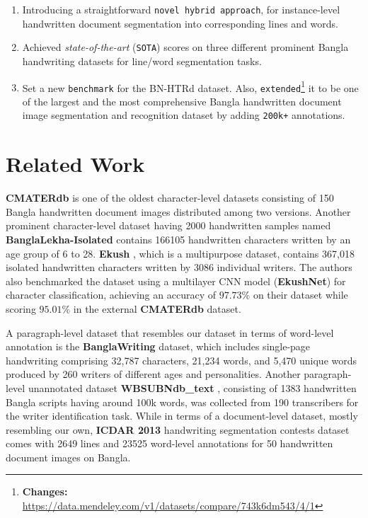 \documentclass[runningheads]{llncs}
\begin{document}
\begin{enumerate}
  \item   Introducing a straightforward \texttt{novel hybrid approach}, for instance-level handwritten document segmentation into corresponding lines and words.
  
  \item	Achieved \textit{state-of-the-art} (\texttt{SOTA}) scores on three different prominent Bangla handwriting datasets for line/word segmentation tasks.
  
  \item	Set a new \texttt{benchmark} for the BN-HTRd dataset. Also, \texttt{extended}\footnote{\textbf{Changes:} \url{https://data.mendeley.com/v1/datasets/compare/743k6dm543/4/1}} it to be one of the largest and the most comprehensive Bangla handwritten document image segmentation and recognition dataset by adding \texttt{200k+} annotations.
  \vspace{-2mm}
\end{enumerate}

\section{Related Work}
\vspace{-2mm}
\textbf{CMATERdb} \cite{sarkar2012cmaterdb1} is one of the oldest character-level datasets consisting of 150 Bangla handwritten document images distributed among two versions. Another prominent character-level dataset having 2000 handwritten samples named \textbf{BanglaLekha-Isolated} \cite{biswas2017banglalekha} contains 166105 handwritten characters written by an age group of 6 to 28. \textbf{Ekush} \cite{rabby2019ekush}, which is a multipurpose dataset, contains 367,018 isolated handwritten characters written by 3086 individual writers. The authors also benchmarked the dataset using a multilayer CNN model (\textbf{EkushNet}) for character classification, achieving an accuracy of $97.73\%$ on their dataset while scoring $95.01\%$ in the external \textbf{CMATERdb} dataset.

A paragraph-level dataset that resembles our dataset in terms of word-level annotation is the \textbf{BanglaWriting} \cite{mridha2021banglawriting} dataset, which includes single-page handwriting comprising 32,787 characters, 21,234 words, and 5,470 unique words produced by 260 writers of different ages and personalities. Another paragraph-level unannotated dataset \textbf{WBSUBNdb\_text} \cite{halder2018content}, consisting of 1383 handwritten Bangla scripts having around 100k words, was collected from 190 transcribers for the writer identification task. While in terms of a document-level dataset, mostly resembling our own, \textbf{ICDAR 2013} \cite{stamatopoulos2013icdar} handwriting segmentation contests dataset comes with 2649 lines and  23525 word-level annotations for 50 handwritten document images on Bangla.
\end{document}
